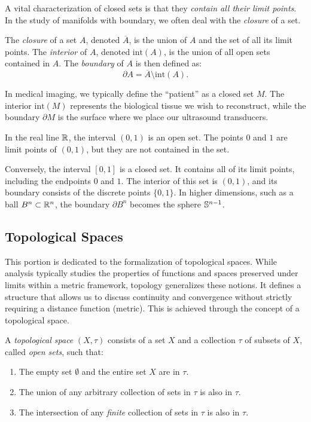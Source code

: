 A vital characterization of closed sets is that they \emph{contain all their limit points}. In the study of manifolds with boundary, we often deal with the \emph{closure} of a set.

\begin{definition}
  The \emph{closure} of a set $A$, denoted $\overline{A}$, is the union of $A$ and the set of all its limit points. The \emph{interior} of $A$, denoted $\text{int}(A)$, is the union of all open sets contained in $A$. The \emph{boundary} of $A$ is then defined as:
  \[%
    \partial A = \overline{A} \setminus \text{int}(A)
  .\]%
\end{definition}

In medical imaging, we typically define the ``patient'' as a closed set $M$. The interior $\text{int}(M)$ represents the biological tissue we wish to reconstruct, while the boundary $\partial M$ is the surface where we place our ultrasound transducers.

\begin{example}
  In the real line $\R$, the interval $(0, 1)$ is an open set. The points $0$ and $1$ are limit points of $(0, 1)$, but they are not contained in the set.

  Conversely, the interval $[0, 1]$ is a closed set. It contains all of its limit points, including the endpoints $0$ and $1$. The interior of this set is $(0, 1)$, and its boundary consists of the discrete points $\{0, 1\}$. In higher dimensions, such as a ball $B^n \subset \R^n$, the boundary $\partial B^n$ becomes the sphere $\S^{n-1}$.
\end{example}

\subsection{Topological Spaces} This portion is dedicated to the formalization of topological spaces. While analysis typically studies the properties of functions and spaces preserved under limits within a metric framework, topology generalizes these notions. It defines a structure that allows us to discuss continuity and convergence without strictly requiring a distance function (metric). This is achieved through the concept of a topological space.

\begin{definition}
  A \emph{topological space} $(X, \tau)$ consists of a set $X$ and a collection $\tau$ of subsets of $X$, called \emph{open sets}, such that:
  \begin{enumerate}
    \item The empty set $\emptyset$ and the entire set $X$ are in $\tau$.
    \item The union of any arbitrary collection of sets in $\tau$ is also in $\tau$.
    \item The intersection of any \emph{finite} collection of sets in $\tau$ is also in $\tau$.
  \end{enumerate}
\end{definition}

